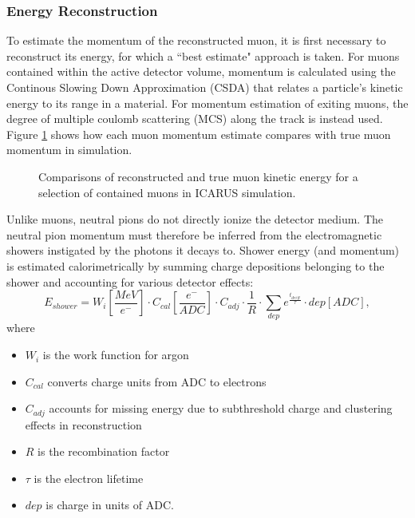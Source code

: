 \documentclass[../main.tex]{subfiles}
\begin{document}
\subsubsection{Energy Reconstruction}
To estimate the momentum of the reconstructed muon, it is first necessary to reconstruct its energy, for which a ``best estimate" approach is taken.  For muons contained within the active detector volume, momentum is calculated using the Continous Slowing Down Approximation (CSDA) that relates a particle's kinetic energy to its range in a material.  For momentum estimation of exiting muons, the degree of multiple coulomb scattering (MCS) along the track is instead used.  Figure \ref{fig:muon_energy} shows how each muon momentum estimate compares with true muon momentum in simulation.

\begin{figure}[H]
    \center
    \caption{Comparisons of reconstructed and true muon kinetic energy for a selection of contained muons in ICARUS simulation.}
    \label{fig:muon_energy}
\end{figure}

Unlike muons, neutral pions do not directly ionize the detector medium.  The neutral pion momentum must therefore be inferred from the electromagnetic showers instigated by the photons it decays to.  Shower energy (and momentum) is estimated calorimetrically by summing charge depositions belonging to the shower and accounting for various detector effects:
\begin{equation}
    E_{shower} = W_{i} [\frac{MeV}{e^{-}}] \cdot C_{cal} [\frac{e^{-}}{ADC}] \cdot C_{adj} \cdot \frac{1}{R} \cdot \sum_{dep} e^{\frac{t_{drift}}{\tau}} \cdot dep [ADC],
    \label{eq:shower_energy}
\end{equation}
where
\begin{itemize}[label=]
    \setlength\itemsep{0.1ex}
    \item $W_{i}$ is the work function for argon
    \item $C_{cal}$ converts charge units from ADC to electrons
    \item $C_{adj}$ accounts for missing energy due to subthreshold charge and clustering effects in reconstruction
    \item $R$ is the recombination factor
    \item $\tau$ is the electron lifetime
    \item $dep$ is charge in units of ADC.
\end{itemize}
\end{document}
